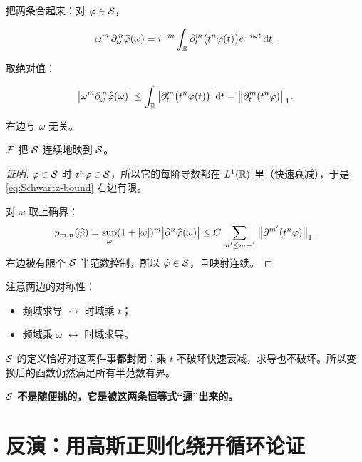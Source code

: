 把两条合起来：对 $\varphi\in\mathcal{S}$，

\begin{equation}
\omega^{m}\,\partial_\omega^{\,n}\widehat{\varphi}(\omega)
=i^{-m}\int_{\mathbb{R}}\partial_t^{m}\big(t^{n}\varphi(t)\big)e^{-i\omega t}\mathop{}\!\mathrm{d} t .
\end{equation}

取绝对值：

\begin{equation}
\big|\omega^{m}\partial_\omega^{\,n}\widehat{\varphi}(\omega)\big|
\le\int_{\mathbb{R}}\big|\partial_t^{m}\big(t^{n}\varphi(t)\big)\big|\mathop{}\!\mathrm{d} t
=\big\|\partial_t^{m}(t^{n}\varphi)\big\|_1 .\label{eq:Schwartz-bound}
\end{equation}

右边与 $\omega$ 无关。

\begin{prop}\label{prop:F-S}
$\mathcal{F}$ 把 $\mathcal{S}$ 连续地映到 $\mathcal{S}$。
\end{prop}

\begin{proof}[证明]
$\varphi\in\mathcal{S}$ 时 $t^{n}\varphi\in\mathcal{S}$，所以它的每阶导数都在 $L^1(\mathbb{R})$ 里（快速衰减），于是 \eqref{eq:Schwartz-bound} 右边有限。

对 $\omega$ 取上确界：
\begin{equation}
p_{m,n}(\widehat{\varphi})=\sup_\omega(1+|\omega|)^{m}\big|\partial^{n}\widehat{\varphi}(\omega)\big|
\le C\sum_{m'\le m+1}\big\|\partial^{m'}(t^{n}\varphi)\big\|_1 .
\end{equation}
右边被有限个 $\mathcal{S}$ 半范数控制，所以 $\widehat{\varphi}\in\mathcal{S}$，且映射连续。
\end{proof}

\begin{ideabox}[为什么这个证明“正好”能成]
注意两边的对称性：
\begin{itemize}[leftmargin=1.4em,itemsep=0.2em]
\item 频域求导 $\longleftrightarrow$ 时域乘 $t$；
\item 频域乘 $\omega$ $\longleftrightarrow$ 时域求导。
\end{itemize}
$\mathcal{S}$ 的定义恰好对这两件事\textbf{都封闭}：乘 $t$ 不破坏快速衰减，求导也不破坏。所以变换后的函数仍然满足所有半范数有界。

\textbf{$\mathcal{S}$ 不是随便挑的，它是被这两条恒等式“逼”出来的。}
\end{ideabox}

\section{反演：用高斯正则化绕开循环论证}

